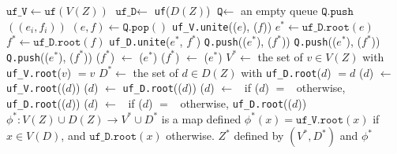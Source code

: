 \documentclass[main.tex]{subfiles}
\begin{document}
\begin{algorithm}[H]
    \caption{\freeHomomorphismTriangulationWithLink($Z$, $\{(e_i, f_i)\}_{i=1}^k$)}
    \label{alg:homomorphism-tri}
    \begin{algorithmic}[1]
        \State $\texttt{uf\_V} \gets \texttt{uf}(V(Z))$
        \State $\texttt{uf\_D} \gets$ \texttt{uf}($D(Z)$)
        \State $\texttt{Q} \gets$ an empty queue
            \State $\texttt{Q.push}$$((e_i, f_i))$
        \EndFor
            \State $(e,f) \gets \texttt{Q.pop}()$ %
                \Continue
            \EndIf
                \State \texttt{uf\_V.unite}(\head($e$), \head($f$))\label{line:unite}
            \EndIf
            \State $e^* \gets \texttt{uf\_D.root}(e)$
            \State $f^* \gets \texttt{uf\_D.root}(f)$
            \State \texttt{uf\_D.unite}($e^*$, $f^*$) 
            \State \texttt{Q.push}(\reverse($e^*$), \reverse($f^*$))
                \State \texttt{Q.push}(\successor($e^*$), \successor($f^*$))
            \EndIf
                \State \texttt{Q.push}(\predecessor($e^*$), \predecessor($f^*$))
            \EndIf
                \State \successor($f^*$) $\gets$ \successor($e^*$)
            \EndIf
                \State \predecessor($f^*$) $\gets$ \predecessor($e^*$)
            \EndIf
        \EndWhile
        \State $V^* \gets$ the set of $v \in V(Z)$ with \texttt{uf\_V.root}($v$) $= v$ 
        \State $D^* \gets$ the set of $d \in D(Z)$ with \texttt{uf\_D.root}($d$) $= d$
            \State \head($d$) $\gets$ \texttt{uf\_V.root}(\head($d$))
            \State \reverse($d$) $\gets$ \texttt{uf\_D.root}(\reverse($d$))
            \State \successor($d$) $\gets$ \nil\ if \successor($d$) $=$ \nil\ otherwise, \texttt{uf\_D.root}(\successor($d$))
            \State \predecessor($d$) $\gets$ \nil\ if \predecessor($d$) $=$ \nil\ otherwise, \texttt{uf\_D.root}(\predecessor($d$))
        \EndFor
        \State $\phi^* \colon V(Z) \cup D(Z) \to V^* \cup D^*$ is a map defined $\phi^*(x)=\texttt{uf\_V.root}(x)$ if $x \in V(D)$, and $\texttt{uf\_D.root}(x)$ otherwise.
        \State \Return $Z^*$ defined by $(V^*, D^*)$ and $\phi^*$
    \end{algorithmic}
\end{algorithm}
\end{document}
